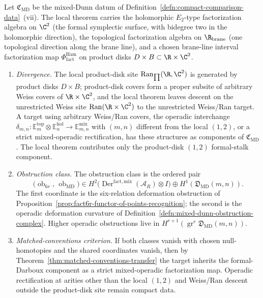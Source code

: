 \begin{thm}\label{thm:divergence-mixed-dunn}
  Let \(\mathfrak C_{\mathrm{MD}}\) be the mixed-Dunn datum of
  Definition~\ref{defn:compact-comparison-data}~(vii).  The
  local theorem carries the holomorphic \(E_2\)-type factorization
  algebra on \(\C^2\) (the formal symplectic surface, with bidegree
  two in the holomorphic direction), the topological factorization
  algebra on \(\R_{\mathrm{brane}}\) (one topological direction along
  the brane line), and a chosen brane-line interval factorization map
  \(\Phi^{\mathrm{Ham}}_{\mathrm{fact}}\) on product disks
  \(D\times B\subset\R\times\C^2\).
  \begin{enumerate}[label=(\roman*)]
    \item \emph{Divergence.}  The local product-disk site
      \(\operatorname{Ran}_{\prod}(\R,\C^2)\) is generated by product
      disks \(D\times B\); product-disk covers form a proper subsite of
      arbitrary Weiss covers of \(\R\times\C^2\), and the local
      theorem leaves descent on the unrestricted Weiss site
      \(\operatorname{Ran}(\R\times\C^2)\) to the unrestricted Weiss/Ran
      target.  A target
      using arbitrary Weiss/Ran covers, the operadic interchange
      \(\delta_{m,n}\colon\mathbb E_m^{\mathrm{top}}\otimes
      \mathbb E_n^{\mathrm{hol}}\to\mathbb E_{m,n}^{\mathrm{mix}}\)
      with \((m,n)\) different from the local \((1,2)\), or a
      strict mixed-operadic rectification, has these structures as
      components of \(\mathfrak C_{\mathrm{MD}}\).  The local theorem
      contributes only the product-disk \((1,2)\) formal-stalk
      component.
    \item \emph{Obstruction class.}  The obstruction class is the
      ordered pair
      \[
        \bigl(
          \operatorname{ob}_{6r},\,
          \operatorname{ob}_{\mathrm{MD}}
        \bigr)
        \in
        H^2\!\bigl(
          \operatorname{Der}^{\mathrm{fact,mix}}(\mathcal A_R)\otimes I
        \bigr)
        \oplus
        H^1(\mathfrak D_{\mathrm{MD}}(m,n)).
      \]
      The first coordinate is the six-relation deformation
      obstruction of
      Proposition~\ref{prop:fact6r-functor-of-points-recognition};
      the second is the operadic deformation curvature of
      Definition~\ref{defn:mixed-dunn-obstruction-complex}.  Higher
      operadic obstructions live in
      \(H^{r+1}(\operatorname{gr}^r\mathfrak D_{\mathrm{MD}}(m,n))\).
    \item \emph{Matched-conventions criterion.}  If both classes vanish
      with chosen null-homotopies and the shared coordinates
      vanish, then by Theorem~\ref{thm:matched-conventions-transfer}
      the target inherits the formal-Darboux component as a strict
      mixed-operadic factorization map.  Operadic rectification at
      arities other than the local \((1,2)\) and Weiss/Ran descent
      outside the product-disk site remain compact data.
  \end{enumerate}
\end{thm}

